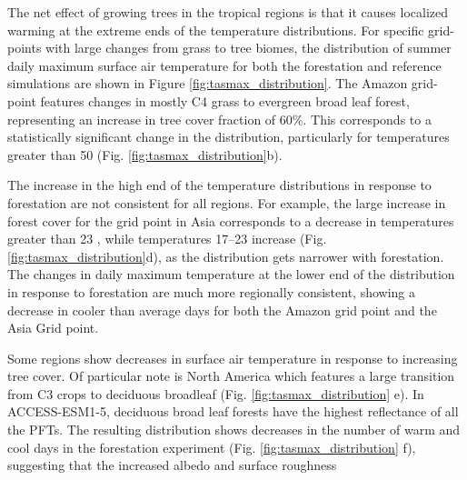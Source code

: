 \documentclass[]{article}
\begin{document}
The net effect of growing trees in the tropical regions is that it causes localized warming at the extreme ends of the temperature distributions.
For specific grid-points with large changes from grass to tree biomes, the distribution of summer daily maximum surface air temperature for both the forestation and reference simulations are shown in Figure \ref{fig:tasmax_distribution}.
The Amazon grid-point features changes in mostly C4 grass to evergreen broad leaf forest, representing an increase in tree cover fraction of 60\%.
This corresponds to a statistically significant change in the distribution, particularly for temperatures greater than 50 \textcelsius{} (Fig. \ref{fig:tasmax_distribution}b).

The increase in the high end of the temperature distributions in response to forestation are not consistent for all regions.
For example, the large increase in forest cover for the grid point in Asia corresponds to a decrease in temperatures greater than 23 \textcelsius{}, while temperatures 17--23 \textcelsius{} increase (Fig. \ref{fig:tasmax_distribution}d), as the distribution gets narrower with forestation.
The changes in daily maximum temperature at the lower end of the distribution in response to forestation are much more regionally consistent, showing a decrease in cooler than average days for both the Amazon grid point and the Asia Grid point.

Some regions show decreases in surface air temperature in response to increasing tree cover.
Of particular note is North America which features a large transition from C3 crops to deciduous broadleaf (Fig. \ref{fig:tasmax_distribution} e).
In ACCESS-ESM1-5, deciduous broad leaf forests have the highest reflectance of all the PFTs.
The resulting distribution shows decreases in the number of warm and cool days in the forestation experiment (Fig. \ref{fig:tasmax_distribution} f), suggesting that the increased albedo and surface roughness 
\end{document}
